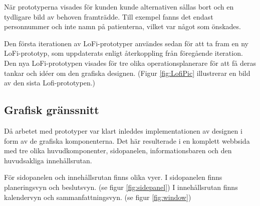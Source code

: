 När prototyperna visades för kunden kunde alternativen sållas bort och en tydligare bild av behoven framträdde.
Till exempel fanns det endast personnummer och inte namn på patienterna, vilket var något som önskades.

Den första iterationen av LoFi-prototyper användes sedan för att ta fram en ny
LoFi-prototyp, som uppdaterats enligt återkoppling från föregående iteration. Den nya LoFi-prototypen visades för tre olika operationsplanerare för att få deras tankar och idéer om den grafiska designen. (Figur \ref{fig:LofiPic} illustrerar en bild av den sista Lofi-prototypen.)

\subsection{Grafisk gränssnitt}
Då arbetet med prototyper var klart inleddes implementationen av designen i form av de grafiska komponenterna. Det här resulterade i en komplett webbsida med tre olika huvudkomponenter, sidopanelen, informationsbaren och den huvudsakliga innehållsrutan.

För sidopanelen och innehållsrutan finns olika vyer.
I sidopanelen finns planeringsvyn och beslutsvyn. (se figur \ref{fig:sidepanel}) I innehållsrutan finns kalendervyn och sammanfattningsvyn. (se figur \ref{fig:window})


